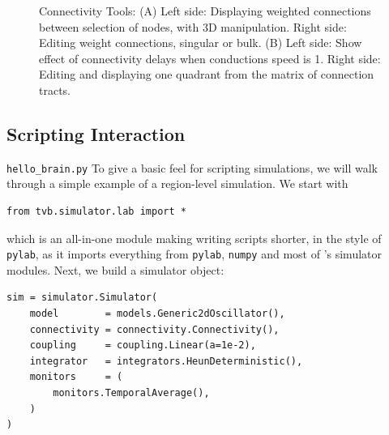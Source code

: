  \begin{figure}
 	\centering
	\qquad
	\caption{Connectivity Tools: 
	(A) Left side: Displaying weighted connections between selection of nodes, with 3D manipulation.
	Right side: Editing weight connections, singular or bulk.
	(B) Left side: Show effect of connectivity delays when conductions speed is 1.
	Right side: Editing and displaying one quadrant from the matrix of connection tracts.}
        \label{fig:connectivity}
\end{figure}



\subsection{Scripting Interaction}

\texttt{hello\_brain.py}
To give a basic feel for scripting \TVB simulations, we will 
walk through a simple example of a region-level simulation. We 
start with

\begin{lstlisting}
from tvb.simulator.lab import *
\end{lstlisting}

\noindent which is an all-in-one module making writing scripts
shorter, in the style of \texttt{pylab}, as it imports everything
from \texttt{pylab}, \texttt{numpy} and most of \TVB's simulator
modules. Next, we build a simulator object:

\begin{lstlisting}
sim = simulator.Simulator(
    model        = models.Generic2dOscillator(), 
    connectivity = connectivity.Connectivity(),
    coupling     = coupling.Linear(a=1e-2),
    integrator   = integrators.HeunDeterministic(),
    monitors     = (
        monitors.TemporalAverage(), 
    )
)
\end{lstlisting}

